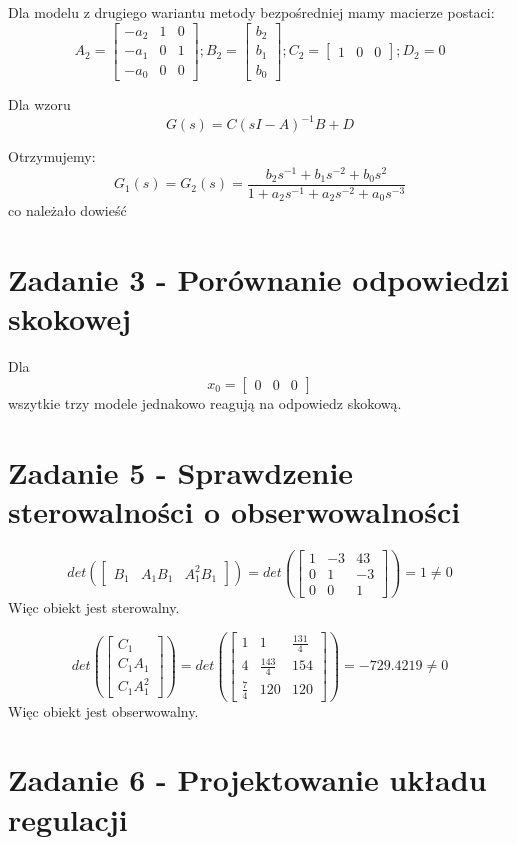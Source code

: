 \documentclass{article}
\begin{document}
Dla modelu z drugiego wariantu metody bezpośredniej mamy macierze postaci:
\[A_2 = \begin{bmatrix} -a_2 & 1 & 0\\ -a_1 & 0 & 1\\ -a_0 & 0 & 0 \end{bmatrix};
B_2 = \begin{bmatrix}  b_2\\ b_1\\ b_0 \end{bmatrix};
C_2 = \begin{bmatrix} 1 & 0 & 0 \end{bmatrix};
D_2 = 0
\]

Dla wzoru 
\[G(s) = C(sI - A)^{-1}B + D\]

Otrzymujemy:
\[G_1(s) = G_2(s) = \frac{b_2s^{-1} + b_1s^{-2} + b_0s^{2}}{1 + a_2s^{-1} +a_2s^{-2} +a_0s^{-3}}\]
co należało dowieść

\section{Zadanie 3 - Porównanie odpowiedzi skokowej}
Dla \[x_0 = \begin{bmatrix}
0 & 0 & 0
\end{bmatrix}\]
wszytkie trzy modele jednakowo reagują na odpowiedz skokową. 

\section{Zadanie 5 - Sprawdzenie sterowalności o obserwowalności}
\[det(\begin{bmatrix}B_1 & A_1B_1 & A^2_1B_1\end{bmatrix}) = 
det(\begin{bmatrix} 1 & -3 & 43\\ 0 & 1 & -3\\ 0 & 0 & 1 \end{bmatrix}) = 1 \neq 0\]
Więc obiekt jest sterowalny.

\[det(\begin{bmatrix}C_1 \\ C_1A_1 \\ C_1A^2_1\end{bmatrix}) = 
det(\begin{bmatrix} 1 & 1 & \frac{131}{4}\\ 4 & \frac{143}{4} & 154\\ \frac{7}{4} & 120 & 120 \end{bmatrix}) = -729.4219 \neq 0\]
Więc obiekt jest obserwowalny.

\section{Zadanie 6 - Projektowanie układu regulacji}
\end{document}

